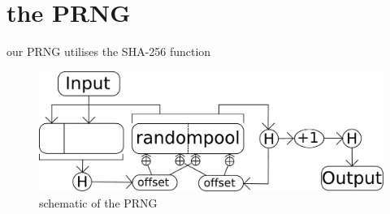 \section{the PRNG}
our PRNG utilises the SHA-256 function
\begin{figure}
\includegraphics[scale=0.3]{PRNG} 
\caption{schematic of the PRNG}
\end{figure}